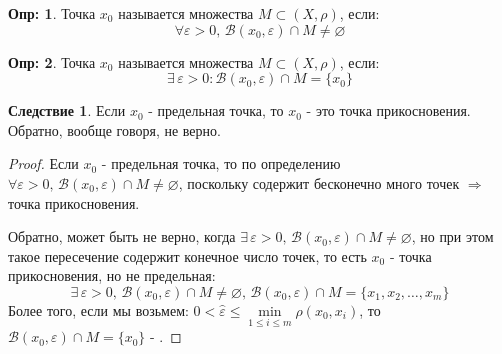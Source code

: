 \documentclass[12pt]{article}
\newcommand{\MB}{\mathcal{B}}
\newcommand{\VN}{\varnothing}
\newcommand{\VE}{\varepsilon}
\theoremstyle{definition}
\newtheorem{defn}{Опр:}
\newtheorem{corollary}{Следствие}
\begin{document}
\begin{defn}
	Точка $x_0$ называется  множества $M \subset (X,\rho)$, если:
	$$
		\forall \VE > 0, \, \MB(x_0,\VE) \cap M \neq \VN
	$$
\end{defn}
\begin{defn}
	Точка $x_0$ называется  множества $M \subset (X,\rho)$, если:
	$$
		\exists\, \VE > 0 \colon \MB(x_0,\VE) \cap M =\{x_0\}
	$$
\end{defn}
\begin{corollary}
	Если $x_0$ - предельная точка, то $x_0$ - это точка прикосновения. Обратно, вообще говоря, не верно.
\end{corollary}
\begin{proof}
	Если $x_0$ - предельная точка, то по определению $\forall \VE > 0, \, \MB(x_0,\VE) \cap M \neq \VN$, поскольку содержит бесконечно много точек $\Rightarrow$ точка прикосновения.
	
	Обратно, может быть не верно, когда $\exists\, \VE > 0, \,\MB(x_0,\VE) \cap M \neq \VN$, но при этом такое пересечение содержит конечное число точек, то есть $x_0$ - точка прикосновения, но не предельная:
	$$
		\exists \, \VE > 0,\, \MB(x_0,\VE) \cap M \neq \VN, \, \MB(x_0,\VE) \cap M = \{x_1,x_2,\dotsc,x_m\}
	$$
	Более того, если мы возьмем: $0 < \hat{\VE} \leq \min\limits_{1 \leq i \leq m}\rho(x_0,x_i)$, то $\MB(x_0,\VE) \cap M = \{x_0\}$ - .
\end{proof}
\end{document}
